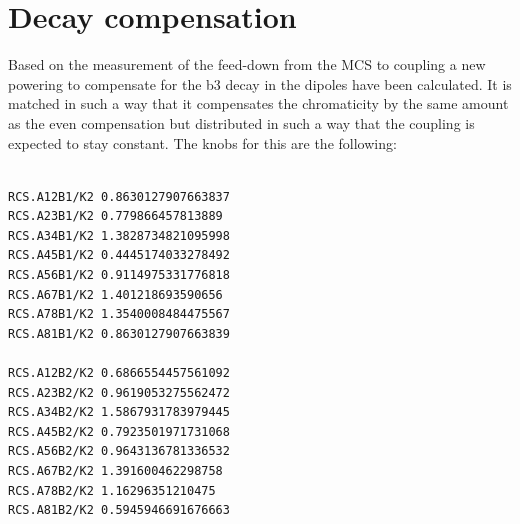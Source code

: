 \documentclass[a4paper]{cernatsnote}
\begin{document}
\section{Decay compensation}
Based on the measurement of the feed-down from the MCS to coupling a new powering to compensate for the b3 decay in the dipoles have been calculated. It is matched in such a way that it compensates the chromaticity by the same amount as the even compensation but distributed in such a way that the coupling is expected to stay constant. The knobs for this are the following:
\begin{verbatim}

RCS.A12B1/K2 0.8630127907663837 
RCS.A23B1/K2 0.779866457813889 
RCS.A34B1/K2 1.3828734821095998 
RCS.A45B1/K2 0.4445174033278492 
RCS.A56B1/K2 0.9114975331776818 
RCS.A67B1/K2 1.401218693590656 
RCS.A78B1/K2 1.3540008484475567 
RCS.A81B1/K2 0.8630127907663839 

RCS.A12B2/K2 0.6866554457561092 
RCS.A23B2/K2 0.9619053275562472 
RCS.A34B2/K2 1.5867931783979445 
RCS.A45B2/K2 0.7923501971731068 
RCS.A56B2/K2 0.9643136781336532 
RCS.A67B2/K2 1.391600462298758 
RCS.A78B2/K2 1.16296351210475 
RCS.A81B2/K2 0.5945946691676663 

\end{verbatim}
\end{document}
